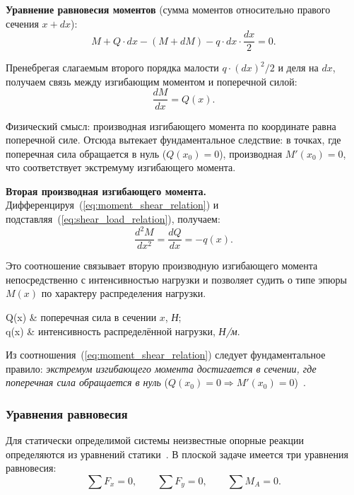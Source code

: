 \textbf{Уравнение равновесия моментов} (сумма моментов относительно правого сечения $x + dx$):
\begin{equation}
  M + Q \cdot dx - (M + dM) - q \cdot dx \cdot \frac{dx}{2} = 0.
  \label{eq:eq_moment_deriv}
\end{equation}

Пренебрегая слагаемым второго порядка малости $q \cdot (dx)^2 / 2$ и деля на $dx$, получаем связь между изгибающим моментом и поперечной силой:
\begin{equation}
  \frac{dM}{dx} = Q(x).
  \label{eq:moment_shear_relation}
\end{equation}

Физический смысл: производная изгибающего момента по координате равна поперечной силе. Отсюда вытекает фундаментальное следствие: в точках, где поперечная сила обращается в нуль ($Q(x_0) = 0$), производная $M'(x_0) = 0$, что соответствует экстремуму изгибающего момента.

\textbf{Вторая производная изгибающего момента.} Дифференцируя~(\ref{eq:moment_shear_relation}) и подставляя~(\ref{eq:shear_load_relation}), получаем:
\begin{equation}
  \frac{d^2 M}{dx^2} = \frac{dQ}{dx} = -q(x).
  \label{eq:moment_load_relation}
\end{equation}

Это соотношение связывает вторую производную изгибающего момента непосредственно с интенсивностью нагрузки и позволяет судить о типе эпюры $M(x)$ по характеру распределения нагрузки.
\begin{conditions}
  Q(x) & поперечная сила в сечении $x$, \textit{Н}; \\
  q(x) & интенсивность распределённой нагрузки, \textit{Н/м}.
\end{conditions}

Из соотношения~(\ref{eq:moment_shear_relation}) следует фундаментальное правило: \textit{экстремум изгибающего момента достигается в сечении, где поперечная сила обращается в нуль} ($Q(x_0) = 0 \Rightarrow M'(x_0) = 0$)~\cite{feodosev}.

\subsubsection{Уравнения равновесия}

Для статически определимой системы неизвестные опорные реакции определяются из уравнений статики~\cite{aleksandrov, belyaev}. В плоской задаче имеется три уравнения равновесия:
\begin{equation}
  \sum F_x = 0, \qquad \sum F_y = 0, \qquad \sum M_A = 0.
  \label{eq:equilibrium}
\end{equation}

